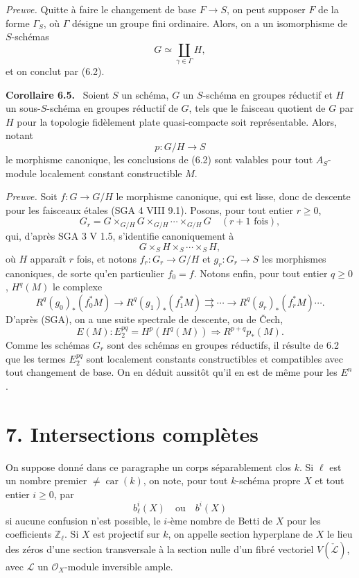 \documentclass[11pt]{article}
\newenvironment{statement}[1]{\par\medskip\noindent\textbf{#1.}\ }{\par\medskip}
\begin{document}
\emph{Preuve.} Quitte à faire le changement de base $F\to S$, on peut supposer $F$ de la forme $\Gamma_S$, où $\Gamma$ désigne un groupe fini ordinaire. Alors, on a un isomorphisme de $S$-schémas
\[
G\simeq\coprod_{\gamma\in\Gamma}H,
\]
et on conclut par (6.2).

\begin{statement}{Corollaire 6.5}
Soient $S$ un schéma, $G$ un $S$-schéma en groupes réductif et $H$ un sous-$S$-schéma en groupes réductif de $G$, tels que le faisceau quotient de $G$ par $H$ pour la topologie fidèlement plate quasi-compacte soit représentable. Alors, notant
\[
p:G/H\to S
\]
le morphisme canonique, les conclusions de (6.2) sont valables pour tout $A_S$-module localement constant constructible $M$.
\end{statement}

\emph{Preuve.} Soit $f:G\to G/H$ le morphisme canonique, qui est lisse, donc de descente pour les faisceaux étales (SGA 4 VIII 9.1). Posons, pour tout entier $r\ge0$,
\[
G_r=G\times_{G/H}G\times_{G/H}\cdots\times_{G/H}G
\quad(r+1\text{ fois}),
\]
qui, d'après SGA 3 V 1.5, s'identifie canoniquement à
\[
G\times_S H\times_S\cdots\times_S H,
\]
où $H$ apparaît $r$ fois, et notons $f_r:G_r\to G/H$ et $g_r:G_r\to S$ les morphismes canoniques, de sorte qu'en particulier $f_0=f$. Notons enfin, pour tout entier $q\ge0$, $H^q(M)$ le complexe
\[
R^q(g_0)_*(f_0^*M)\to R^q(g_1)_*(f_1^*M)\rightrightarrows\cdots\to R^q(g_r)_*(f_r^*M)\cdots .
\]
D'après (SGA), on a une suite spectrale de descente, ou de Čech,
\[
E(M):E_2^{pq}=H^p(H^q(M))\Rightarrow R^{p+q}p_*(M).
\]
Comme les schémas $G_r$ sont des schémas en groupes réductifs, il résulte de 6.2 que les termes $E_2^{pq}$ sont localement constants constructibles et compatibles avec tout changement de base. On en déduit aussitôt qu'il en est de même pour les $E^n$.

\section*{7. Intersections complètes}

On suppose donné dans ce paragraphe un corps séparablement clos $k$. Si $\ell$ est un nombre premier $\ne\operatorname{car}(k)$, on note, pour tout $k$-schéma propre $X$ et tout entier $i\ge0$, par
\[
b_\ell^i(X)\quad\text{ou}\quad b^i(X)
\]
si aucune confusion n'est possible, le $i$-ème nombre de Betti de $X$ pour les coefficients $\mathbb Z_\ell$. Si $X$ est projectif sur $k$, on appelle section hyperplane de $X$ le lieu des zéros d'une section transversale à la section nulle d'un fibré vectoriel $V(\check{\mathcal L})$, avec $\mathcal L$ un $\mathcal O_X$-module inversible ample.
\end{document}
